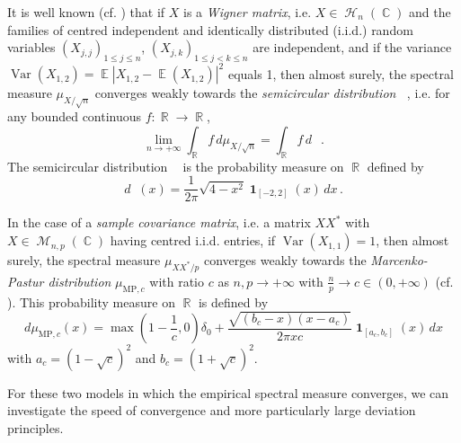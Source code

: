 \documentclass[11pt,a4paper]{article}
\DeclareMathOperator{\E}{\mathbb{E}}
\DeclareMathOperator{\R}{\mathbb{R}}
\DeclareMathOperator{\C}{\mathbb{C}}
\DeclareMathOperator{\HH}{\mathcal{H}}
\DeclareMathOperator{\MM}{\mathcal{M}}
\DeclareMathOperator{\1}{\mathbf{1}}
\DeclareMathOperator{\Var}{\mathrm{Var}}
\DeclareMathOperator{\musc}{\mu_{\mathrm{sc}}}
\newcommand{\mump}{\mu_{\mathrm{MP},c}}
\theoremstyle{definition}
\begin{document}
It is well known (cf. \cite{W}) that if $X$ is a \emph{Wigner matrix}, i.e. $X \in \HH_n(\C)$ and the families of centred independent and identically distributed (i.i.d.) random variables $(X_{j,j})_{1 \le j \le n}$, $(X_{j,k})_{1 \le j < k \le n}$ are independent, and if the variance $\Var(X_{1,2}) = \E |X_{1,2} - \E(X_{1,2})|^2$ equals 1, then almost surely, the spectral measure $\mu_{X/\sqrt{n}}$ converges weakly towards the \emph{semicircular distribution} $\musc$, i.e. for any bounded continuous $f : \R \to \R$,
\begin{displaymath}
\lim_{n \to +\infty} \int_{\R} f \, d\mu_{X/\sqrt{n}} = \int_{\R} f \, d\musc \, .
\end{displaymath}
The semicircular distribution $\musc$ is the probability measure on $\R$ defined by
\begin{displaymath}
d\musc(x) = \frac{1}{2\pi} \sqrt{4-x^2} \1_{[-2,2]}(x) \, dx \, .
\end{displaymath}

In the case of a \emph{sample covariance matrix}, i.e. a matrix $XX^*$ with $X \in \MM_{n,p}(\C)$ having centred i.i.d. entries, if $\Var(X_{1,1})=1$, then almost surely, the spectral measure $\mu_{XX^*/p}$ converges weakly towards the \emph{Marcenko-Pastur distribution} $\mump$ with ratio $c$ as $n,p \to +\infty$ with $\frac{n}{p} \to c \in (0,+\infty)$ (cf. \cite{MP}). This probability measure on $\R$ is defined by
\begin{displaymath}
d\mump(x) = \max \left( 1-\frac1c , 0 \right) \delta_0 + \frac{\sqrt{(b_c-x)(x-a_c)}}{2\pi xc} \1_{[a_c,b_c]}(x) \, dx
\end{displaymath}
with $a_c=(1-\sqrt{c})^2$ and $b_c=(1+\sqrt{c})^2$.

For these two models in which the empirical spectral measure converges, we can investigate the speed of convergence and more particularly large deviation principles.\\
\end{document}

